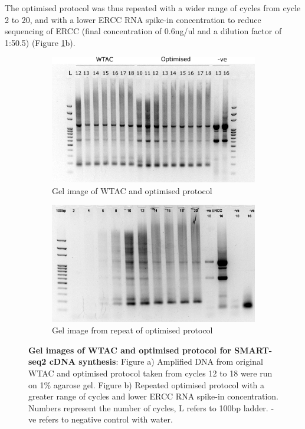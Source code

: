 The optimised protocol was thus repeated with a wider range of cycles from cycle 2 to 20, and with a lower ERCC RNA spike-in concentration to reduce sequencing of ERCC (final concentration of 0.6ng/ul and a dilution factor of 1:50.5) (Figure \ref{fig:wtac_optimised_gel1_2}b). 
    

\begin{figure}[h]
	\centering
	\begin{subfigure}{0.4\linewidth}
		\includegraphics[width=\linewidth, height=0.15\textheight]{Figures/WTAC_Adapted_Gel1.png}
		\caption{Gel image of WTAC and optimised protocol}
	\end{subfigure}
	\hspace{2em}
	\begin{subfigure}{0.4\linewidth}
		\includegraphics[width=\linewidth, height=0.15\textheight]{Figures/WTAC_Adapted_Final.png}
		\caption{Gel image from repeat of optimised protocol}
	\end{subfigure}
	\captionsetup{width=0.95\textwidth}
	\caption[Gel image of repeated optimised protocol]%
	{\textbf{Gel images of WTAC and optimised protocol for SMART-seq2 cDNA synthesis}: Figure a) Amplified DNA from original WTAC and optimised protocol taken from cycles 12 to 18 were run on 1\% agarose gel. Figure b) Repeated optimised protocol with a greater range of cycles and lower ERCC RNA spike-in concentration. Numbers represent the number of cycles, L refers to 100bp ladder. -ve refers to negative control with water.} 
	\label{fig:wtac_optimised_gel1_2}
\end{figure} 
\resumetocwriting
